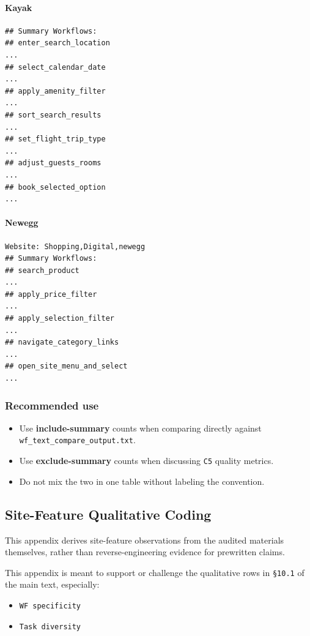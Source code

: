 \paragraph{Kayak}

\begin{verbatim}
## Summary Workflows:
## enter_search_location
...
## select_calendar_date
...
## apply_amenity_filter
...
## sort_search_results
...
## set_flight_trip_type
...
## adjust_guests_rooms
...
## book_selected_option
...
\end{verbatim}

\paragraph{Newegg}

\begin{verbatim}
Website: Shopping,Digital,newegg
## Summary Workflows:
## search_product
...
## apply_price_filter
...
## apply_selection_filter
...
## navigate_category_links
...
## open_site_menu_and_select
...
\end{verbatim}

\subsubsection{Recommended use}

\begin{itemize}
\tightlist
\item
  Use \textbf{include-summary} counts when comparing directly against
  \texttt{wf\_text\_compare\_output.txt}.
\item
  Use \textbf{exclude-summary} counts when discussing \texttt{C5}
  quality metrics.
\item
  Do not mix the two in one table without labeling the convention.
\end{itemize}


\clearpage
\subsection{Site-Feature Qualitative Coding}\label{app:C4}

This appendix derives site-feature observations from the audited
materials themselves, rather than reverse-engineering evidence for
prewritten claims.

This appendix is meant to support or challenge the qualitative rows in
\texttt{§10.1} of the main text,
especially:

\begin{itemize}
\tightlist
\item
  \texttt{WF\ specificity}
\item
  \texttt{Task\ diversity}
\end{itemize}

